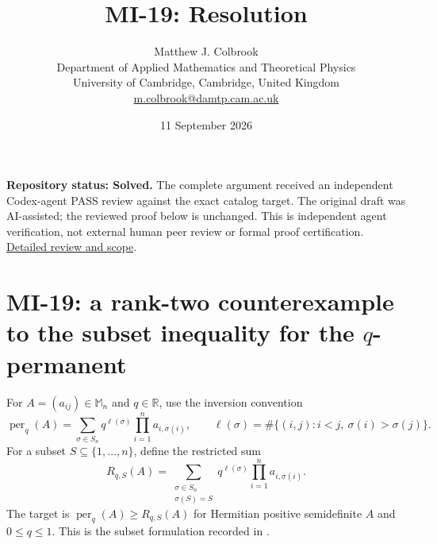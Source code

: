 \documentclass[10pt,a4paper]{article}
\title{MI-19: Resolution}
\author{Matthew J. Colbrook\\
\small Department of Applied Mathematics and Theoretical Physics\\
\small University of Cambridge, Cambridge, United Kingdom\\
\small\href{mailto:m.colbrook@damtp.cam.ac.uk}{m.colbrook@damtp.cam.ac.uk}}
\date{11 September 2026}
\theoremstyle{remark}
\newcommand{\M}{\mathbb M}
\newcommand{\R}{\mathbb R}
\begin{document}
\maketitle
\textbf{Repository status: Solved.}
The complete argument received an independent Codex-agent PASS review
against the exact catalog target.
The original draft was AI-assisted; the reviewed proof below is unchanged.
This is independent agent verification, not external human peer review or
formal proof certification. \href{https://github.com/ajt60gaibb/OpenProblemsInNLA/blob/main/references/colbrook-matrix-2026-09-11/verification/reviews/MI-19-review.md}{Detailed review and scope}.
\par\medskip
\section{MI-19: a rank-two counterexample to the subset inequality for the \texorpdfstring{$q$}{q}-permanent}
\label{sec:mi19}
For $A=(a_{ij})\in\M_n$ and $q\in\R$, use the inversion convention
\[
 \operatorname{per}_q(A)=\sum_{\sigma\in S_n}q^{\ell(\sigma)}\prod_{i=1}^n a_{i,\sigma(i)},\qquad
 \ell(\sigma)=\#\{(i,j):i<j,\ \sigma(i)>\sigma(j)\}.
\]
For a subset $S\subseteq\{1,\ldots,n\}$, define the restricted sum
\[
 R_{q,S}(A)=\sum_{\substack{\sigma\in S_n\\\sigma(S)=S}}
 q^{\ell(\sigma)}\prod_{i=1}^n a_{i,\sigma(i)}.
\]
The target is $\operatorname{per}_q(A)\geq R_{q,S}(A)$ for Hermitian positive semidefinite $A$ and $0\leq q\leq1$. This is the subset formulation recorded in \cite[Conjecture 3, equation (5.1)]{Fonseca2018}.
\end{document}
